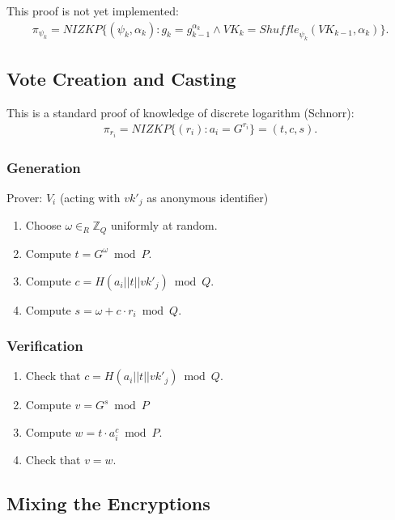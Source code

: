 \documentclass[bibtotoc,halfparskip,oneside]{scrreprt}
\newcommand{\vkprime}[1]{\mathit{vk}'_{#1}\xspace}
\begin{document}
This proof is not yet implemented:
\begin{align*}
\pi_{\psi_k}=\mathit{NIZKP}\{(\psi_k,\alpha_k):g_k=g_{k-1}^{\alpha_k}\wedge \mathit{VK}_{k}=\mathit{Shuffle}_{\psi_k}(\mathit{VK}_{k-1},\alpha_k)\}.
\end{align*}

\subsection{Vote Creation and Casting}\label{proof_vote}

This is a standard proof of knowledge of discrete logarithm (Schnorr):
\begin{align*}
\pi_{r_i}=\mathit{NIZKP}\{(r_i):a_i=G^{r_i}\}=(t,c,s).
\end{align*}

\subsubsection{Generation}
Prover: $V_i$ (acting with $\vkprime{j}$ as anonymous identifier)
\begin{enumerate}	
	\item Choose $\omega\in_R\mathbb{Z}_Q$ uniformly at random.
	\item Compute $t=G^{\omega}\bmod{P}$.
	\item Compute $c=H(a_i||t||\vkprime{j})\bmod{Q}$.
	\item Compute $s=\omega + c\cdot r_i\bmod{Q}$.
\end{enumerate}

\subsubsection{Verification}
\begin{enumerate}
	\item Check that $c=H(a_i||t||\vkprime{j})\bmod{Q}$.
	\item Compute $v=G^{s}\bmod{P}$
	\item Compute $w=t\cdot a_i^{c}\bmod{P}$.
	\item Check that $v=w$.
\end{enumerate}

\subsection{Mixing the Encryptions}\label{proof_mix_encryptions}
\end{document}
